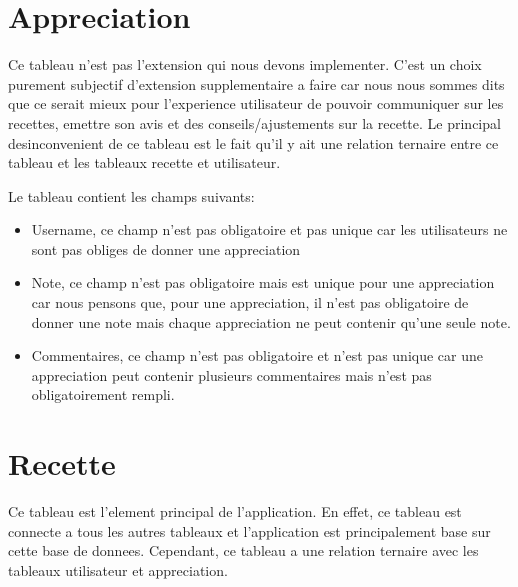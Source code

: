 \documentclass[a4paper,10pt]{report}
\begin{document}
\section{Appreciation}

Ce tableau n'est pas l'extension qui nous devons implementer. C'est un choix purement subjectif d'extension supplementaire a faire car nous nous sommes dits que ce serait mieux pour l'experience utilisateur de pouvoir communiquer sur les recettes, emettre son avis et des conseils/ajustements sur la recette. Le principal desinconvenient de ce tableau est le fait qu'il y ait une relation ternaire entre ce tableau et les tableaux recette et utilisateur.

Le tableau contient les champs suivants:
\begin{itemize}
	\item Username, ce champ n'est pas obligatoire et pas unique car les utilisateurs ne sont pas obliges de donner une appreciation
	\item Note, ce champ n'est pas obligatoire mais est unique pour une appreciation car nous pensons que, pour une appreciation, il n'est pas obligatoire de donner une note mais chaque appreciation ne peut contenir qu'une seule note.
	\item Commentaires, ce champ n'est pas obligatoire et n'est pas unique car une appreciation peut contenir plusieurs commentaires mais n'est pas obligatoirement rempli.
\end{itemize}

\section{Recette}

Ce tableau est l'element principal de l'application. En effet, ce tableau est connecte a tous les autres tableaux et l'application est principalement base sur cette base de donnees. Cependant, ce tableau a une relation ternaire avec les tableaux utilisateur et appreciation.
\end{document}
